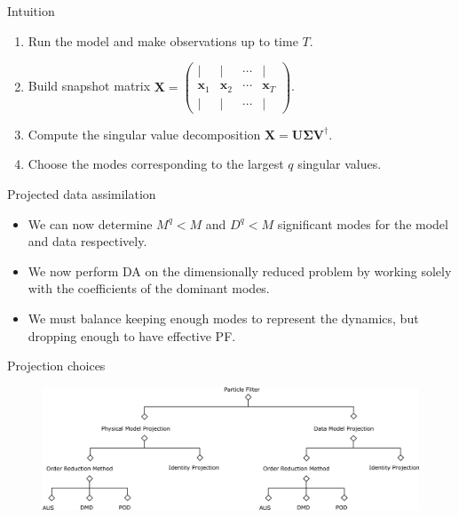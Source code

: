 \documentclass[aspectratio=169]{beamer}
\newcommand{\state}{\boldsymbol{x}}
\newcommand{\snapshot}{\boldsymbol{X}}
\begin{document}
\begin{frame}{Intuition}
    \begin{enumerate}[1.]
        \item Run the model and make observations up to time $T$.
        \item Build snapshot matrix $\snapshot = \begin{pmatrix} \vert & \vert & \cdots & \vert \\ \state_1 & \state_2 & \cdots & \state_T \\ \vert & \vert & \cdots & \vert\end{pmatrix}$.
        \item Compute the singular value decomposition $\snapshot = \boldsymbol{U \Sigma V}^\dagger$.
        \item Choose the modes corresponding to the largest $q$ singular values.
    \end{enumerate}
\end{frame}


\begin{frame}{Projected data assimilation}
    \begin{itemize}
        \item We can now determine $M^q<M$ and $D^q<M$ significant modes for the model and data respectively.
        \item We now perform DA on the dimensionally reduced problem by working solely with the coefficients of the dominant modes.
        \item We must balance keeping enough modes to represent the dynamics, but dropping enough to have effective PF.
    \end{itemize}
\end{frame}


\begin{frame}{Projection choices}
\vfill
    \begin{figure}[H]
        \centering
        \includegraphics[width=.7\textwidth]{figures/decision_tree.png}
    \end{figure}
\vfill
\end{frame}
\end{document}
